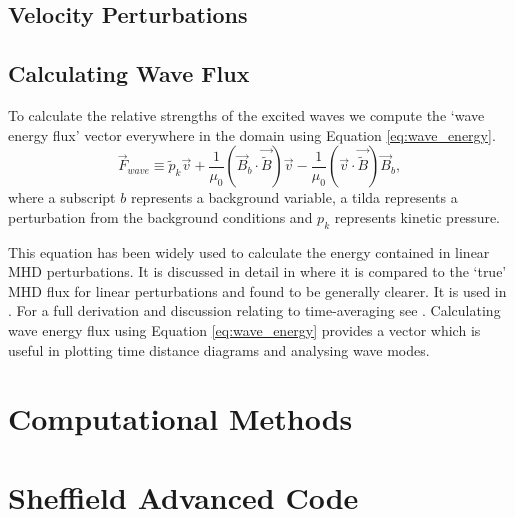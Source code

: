 \subsection{Velocity Perturbations}\label{sec:Vpert}

\subsection{Calculating Wave Flux}\label{sec:waveflux}


To calculate the relative strengths of the excited waves we compute the `wave energy flux' vector everywhere in the domain using Equation \ref{eq:wave_energy}.
\begin{equation}
\vec{F}_{wave} \equiv \widetilde{p}_k \vec{v} + \frac{1}{\mu_0} \left(\vec{B}_b \cdot \vec{\widetilde{B}}\right) \vec{v} - \frac{1}{\mu_0}\left(\vec{v} \cdot \vec{\widetilde{B}} \right) \vec{B}_b,
\label{eq:wave_energy}
\end{equation}
where a subscript $b$ represents a background variable, a tilda represents a perturbation from the background conditions and $p_k$ represents kinetic pressure.

This equation has been widely used to calculate the energy contained in linear MHD perturbations.
It is discussed in detail in \cite{bogdan2003} where it is compared to the `true' MHD flux for linear perturbations and found to be generally clearer. 
It is used in \cite{vigeesh2009, vigeesh2012, khomenko2012}. 
For a full derivation and discussion relating to time-averaging see \cite{leroy1985}.
Calculating wave energy flux using Equation \ref{eq:wave_energy} provides a vector which is useful in plotting time distance diagrams and analysing wave modes.

\section{Computational Methods}\label{sec:numericalmethods}

\section{Sheffield Advanced Code}\label{sec:SAC}